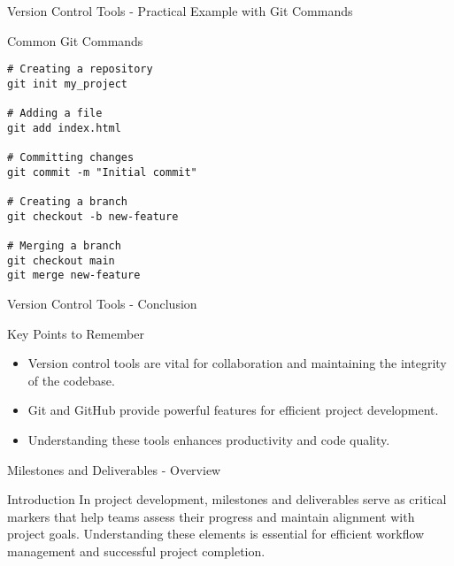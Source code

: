 \documentclass[aspectratio=169]{beamer}
\begin{document}
\begin{frame}[fragile]{Version Control Tools - Practical Example with Git Commands}
  \begin{block}{Common Git Commands}
    \begin{lstlisting}
# Creating a repository
git init my_project

# Adding a file
git add index.html

# Committing changes
git commit -m "Initial commit"

# Creating a branch
git checkout -b new-feature

# Merging a branch
git checkout main
git merge new-feature
    \end{lstlisting}
  \end{block}
\end{frame}

\begin{frame}[fragile]{Version Control Tools - Conclusion}
  \begin{block}{Key Points to Remember}
    \begin{itemize}
      \item Version control tools are vital for collaboration and maintaining the integrity of the codebase.
      \item Git and GitHub provide powerful features for efficient project development.
      \item Understanding these tools enhances productivity and code quality.
    \end{itemize}
  \end{block}
\end{frame}

\begin{frame}[fragile]{Milestones and Deliverables - Overview}
  \begin{block}{Introduction}
    In project development, milestones and deliverables serve as critical markers that help teams assess their progress and maintain alignment with project goals. Understanding these elements is essential for efficient workflow management and successful project completion.
  \end{block}
\end{frame}
\end{document}
